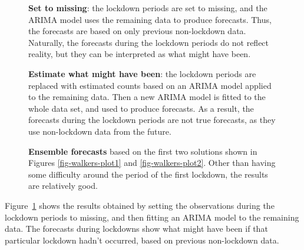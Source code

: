 \documentclass[11pt,a4paper,]{article}
\begin{document}
\begin{figure}


\caption{\label{fig-walkers-plot3}\textbf{Set to missing}: the lockdown
periods are set to missing, and the ARIMA model uses the remaining data
to produce forecasts. Thus, the forecasts are based on only previous
non-lockdown data. Naturally, the forecasts during the lockdown periods
do not reflect reality, but they can be interpreted as what might have
been.}

\end{figure}%

\begin{figure}


\caption{\label{fig-walkers-plot4}\textbf{Estimate what might have
been}: the lockdown periods are replaced with estimated counts based on
an ARIMA model applied to the remaining data. Then a new ARIMA model is
fitted to the whole data set, and used to produce forecasts. As a
result, the forecasts during the lockdown periods are not true
forecasts, as they use non-lockdown data from the future.}

\end{figure}%

\begin{figure}


\caption{\label{fig-walkers-ensemble-plot}\textbf{Ensemble forecasts}
based on the first two solutions shown in Figures
\ref{fig-walkers-plot1} and \ref{fig-walkers-plot2}. Other than having
some difficulty around the period of the first lockdown, the results are
relatively good.}

\end{figure}%

Figure~\ref{fig-walkers-plot3} shows the results obtained by setting the
observations during the lockdown periods to missing, and then fitting an
ARIMA model to the remaining data. The forecasts during lockdowns show
what might have been if that particular lockdown hadn't occurred, based
on previous non-lockdown data.
\end{document}
